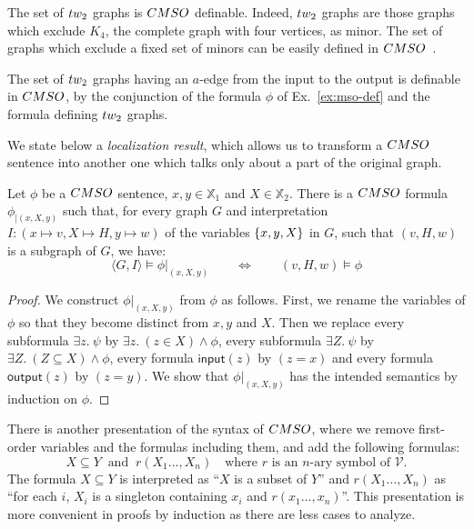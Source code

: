 \begin{example}
 The set of $\TWT$ graphs is $\CMSO$ definable. Indeed, $\TWT$ graphs are those graphs which exclude $K_4$, the complete graph with four vertices, as  minor. The set of graphs which exclude a fixed set of minors can be easily defined in $\CMSO$~\cite{Courcelle2012GraphSA}. 
 
 The set of $\TWT$ graphs having an $a$-edge from the input to the output is  definable in $\CMSO$, by the conjunction of the formula $\phi$ of Ex.~\ref{ex:mso-def} and the formula defining $\TWT$ graphs. 
  \end{example}

We state below a \emph{localization result}, which allows us to transform a $\CMSO$ sentence into another one which talks only about a part of the original graph. 


\begin{proposition}\label{prop:localization}
Let $\phi$ be a $\CMSO$ sentence, $x,y\in \mathbb{X}_1$ and $X\in\mathbb{X}_2$. There is a $\CMSO$ formula $\phi_{|(x,X,y)}$ such that, for every graph $G$ and  interpretation $I:(x\mapsto v, X\mapsto H, y\mapsto w)$ of the variables $\left\{x,y,X\right\}$ in $G$, such that $(v,H,w)$ is a subgraph of $G$, we have:
$$ \langle G, I\rangle \models \phi|_{(x,X,y)}\qquad \Leftrightarrow \qquad (v, H, w) \models \phi$$
\end{proposition}

\begin{proof}
We construct $\phi|_{(x,X,y)}$ from $\phi$ as follows. First, we rename the variables of $\phi$ so that they become distinct from $x,y$ and $X$. Then we replace every subformula $\exists z.\ \psi$ by $\exists z.\ (z\in X)\wedge \phi$, every subformula $\exists Z.\ \psi$ by $\exists Z.\ (Z\subseteq X)\wedge \phi$,  every formula $\mathsf{input}(z)$ by $(z=x)$ and every formula $\mathsf{output}(z)$ by $(z=y)$.
We show that $\phi|_{(x,X,y)}$ has the intended semantics by induction on $\phi$. 
\end{proof}

\begin{remark} There is another  presentation of the syntax of $\CMSO$, where we remove first-order variables and the formulas including them, and  add the following formulas:
$$ X\subseteq Y\ \text{ and } \ r(X_1\dots, X_n) \quad \text{where $r$ is an $n$-ary symbol of $\mathcal{V}$.}$$
The formula $X\subseteq Y$ is interpreted as ``$X$ is a subset of $Y$'' and $r(X_1\dots, X_n)$ as ``for each $i$, $X_i$ is a singleton containing $x_i$ and $r(x_1\dots, x_n)$''.  This presentation is more convenient in proofs by induction as there are less cases to analyze. 
\end{remark}


